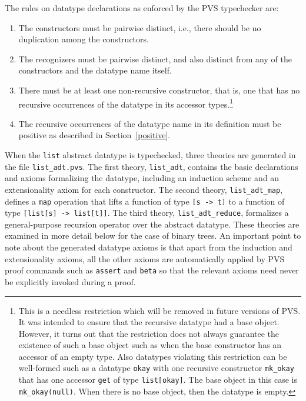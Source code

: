 \documentclass[11pt,twoside]{book}
\begin{document}
The rules on datatype declarations as enforced by the PVS typechecker are:
\begin{enumerate}

\item The constructors must be pairwise distinct, i.e., there should be no
duplication among the constructors.

\item The recognizers must be pairwise distinct, and also distinct
from any of the constructors and the datatype name itself.


\item There must be at least one non-recursive constructor, that is, one
that has no recursive occurrences of the datatype in its accessor
types.\footnote{This is a needless restriction which will be removed
in future versions of PVS.  It was intended to ensure
that the recursive datatype had a base object.  However, it turns out
that the restriction does not always guarantee the existence of such a
base object such as when the base constructor has an accessor of an empty
type.   Also  datatypes violating this restriction can be well-formed
such as a datatype \texttt{okay} with one recursive constructor \texttt{mk\_okay}
that has one accessor \texttt{get} of type \texttt{list[okay]}\@.  The base
object in this case is \texttt{mk\_okay(null)}\@.  When there is no
base object, then the datatype is empty.  }

\item The recursive occurrences of the datatype name in its definition
must be positive as described in Section~\ref{positive}.
\end{enumerate}

When the \texttt{list} abstract datatype is typechecked, three theories are
generated in the file \texttt{list\_adt.pvs}\@.    The first theory,
\texttt{list\_adt},  contains
the basic declarations and axioms formalizing the datatype, including an
induction scheme and an extensionality axiom for each constructor.
The second theory, \texttt{list\_adt\_map}, defines a \texttt{map} operation
that lifts a function of
type \texttt{[s -> t]} to a function of type \texttt{[list[s] -> list[t]]}\@.   
The third theory, \texttt{list\_adt\_reduce}, formalizes a general-purpose
recursion operator 
over the abstract datatype.   These theories are  examined in more
detail below for the case of binary trees.  An important point to note
about the generated datatype axioms is that apart from the induction and
extensionality axioms, all the other axioms are automatically applied by
PVS proof commands such as \texttt{assert} and \texttt{beta} so that the
relevant axioms need never be explicitly invoked during a proof.
\end{document}
